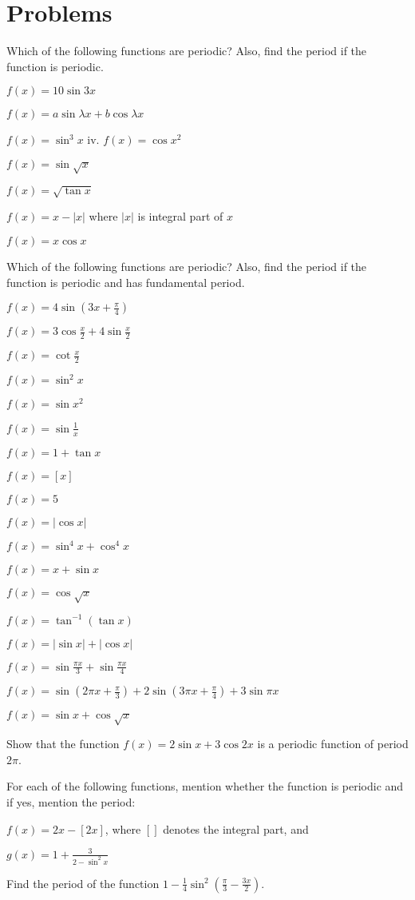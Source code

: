 \section{Problems}
\startitemize[n, 1*broad]
\item Which of the following functions are periodic? Also, find the period if the function is periodic.
\item $f(x) = 10\sin3x$
\item $f(x) = a\sin\lambda x + b\cos\lambda x$
\item $f(x) = \sin^3x$ iv. $f(x) = \cos x^2$
\item $f(x) = \sin\sqrt{x}$
\item $f(x) = \sqrt{\tan x}$
\item $f(x) = x - |x|$ where $|x|$ is integral part of $x$
\item $f(x) = x\cos x$
  \stopitemize

\item Which of the following functions are periodic? Also, find the period if the function is periodic and has
  fundamental period.
\item $f(x) = 4\sin\left(3x + \frac{\pi}{4}\right)$
\item $f(x) = 3\cos\frac{x}{2} + 4\sin\frac{x}{2}$
\item $f(x) = \cot\frac{x}{2}$
\item $f(x) = \sin^2x$
\item $f(x) = \sin x^2$
\item $f(x) = \sin\frac{1}{x}$
\item $f(x) = 1 + \tan x$
\item $f(x) = [x]$
\item $f(x) = 5$
\item $f(x) = |\cos x|$
\item $f(x) = \sin^4x + \cos^4x$
\item $f(x) = x + \sin x$
\item $f(x) = \cos\sqrt{x}$
\item $f(x) = \tan^{-1}(\tan x)$
\item $f(x) = |\sin x| + |\cos x|$
\item $f(x) = \sin\frac{\pi x}{3} + \sin\frac{\pi x}{4}$
\item $f(x) = \sin\left(2\pi x + \frac{\pi}{3}\right) + 2\sin\left(3\pi x + \frac{\pi}{4}\right) + 3\sin\pi x$
\item $f(x) = \sin x + \cos\sqrt{x}$
\stopitemize
\item Show that the function $f(x) = 2\sin x + 3\cos 2x$ is a periodic function of period $2\pi$.

\item For each of the following functions, mention whether the function is periodic and if yes, mention the
   period:
\startitemize[a]
\item $f(x) = 2x - [2x]$, where $[ ]$ denotes the integral part, and
\item $g(x) = 1 + \frac{3}{2 - \sin^2x}$
\stopitemize
\item Find the period of the function $1 - \frac{1}{4}\sin^2\left(\frac{\pi}{3} - \frac{3x}{2}\right)$.
  \stopitemize
